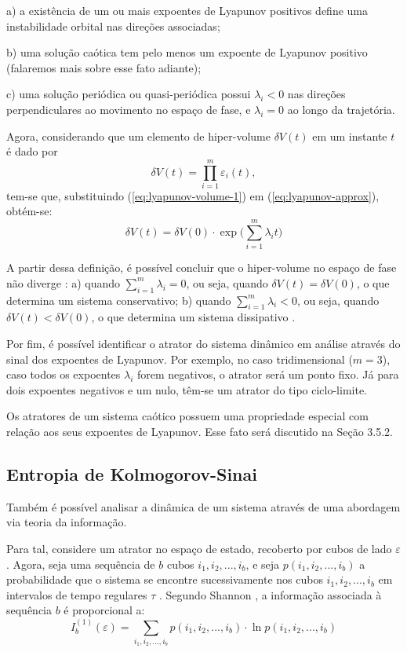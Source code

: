 \documentclass[a4paper, 12pt]{article}
\begin{document}
a) a existência de um ou mais expoentes de Lyapunov positivos define uma instabilidade orbital nas direções associadas;

b) uma solução caótica tem pelo menos um expoente de Lyapunov positivo (falaremos mais sobre esse fato adiante);

c) uma solução periódica ou quasi-periódica possui $\lambda_i < 0$ nas direções perpendiculares ao movimento no espaço de fase, e $\lambda_i = 0$ ao longo da trajetória.

Agora, considerando que um elemento de hiper-volume $\delta V(t)$ em um instante $t$ é dado por
\begin{equation}\label{eq:lyapunov-volume-1}
\delta V(t) = \prod_{i=1}^{m} \varepsilon_i (t)\mathtt{,}
\end{equation}
tem-se que, substituindo (\ref{eq:lyapunov-volume-1}) em (\ref{eq:lyapunov-approx}), obtém-se:
\begin{equation}
\delta V(t) = \delta V(0) \cdot \exp \big(\sum_{i=1}^{m} \lambda_i t\big)
\end{equation}

A partir dessa definição, é possível concluir que o hiper-volume no espaço de fase não diverge : a) quando $\sum_{i=1}^{m} \lambda_i = 0$, ou seja, quando $\delta V(t) = \delta V(0)$, o que determina um sistema conservativo; b) quando $\sum_{i=1}^{m} \lambda_i < 0$, ou seja, quando $\delta V(t) < \delta V(0)$, o que determina um sistema dissipativo \cite{fiedler1994caos}.

Por fim, é possível identificar o atrator do sistema dinâmico em análise através do sinal dos expoentes de Lyapunov. Por exemplo, no caso tridimensional ($m=3$), caso todos os expoentes $\lambda_i$ forem negativos, o atrator será um ponto fixo. Já para dois expoentes negativos e um nulo, têm-se um atrator do tipo ciclo-limite.

Os atratores de um sistema caótico possuem uma propriedade especial com relação aos seus expoentes de Lyapunov. Esse fato será discutido na Seção 3.5.2.

\subsection{Entropia de Kolmogorov-Sinai}
Também é possível analisar a dinâmica de um sistema através de uma abordagem via teoria da informação.

Para tal, considere um atrator no espaço de estado, recoberto por cubos de lado $\varepsilon$. Agora, seja uma sequência de $b$ cubos $i_1, i_2, ..., i_b$, e seja $p(i_1, i_2, ..., i_b)$ a probabilidade que o sistema se encontre sucessivamente nos cubos $i_1, i_2, ..., i_b$ em intervalos de tempo regulares $\tau$ \cite{fiedler1994caos, attux2001dinamica}. Segundo Shannon  \cite{shannon1948mathematical}, a informação associada à sequência $b$ é proporcional a:
\begin{equation}
I_{b}^{(1)} (\varepsilon) = \sum_{i_1, i_2, ..., i_b} p(i_1, i_2, ..., i_b) \cdot \ln p(i_1, i_2, ..., i_b)
\end{equation}
\end{document}
